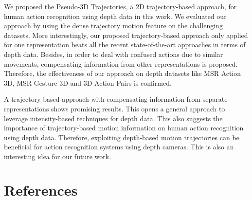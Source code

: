 \documentclass[final,3p,times,twocolumn]{elsarticle}
\begin{document}
We proposed the Pseudo-3D Trajectories, a 2D trajectory-based approach, for human action recognition using depth data in this work.
We evaluated our approach by using the dense trajectory motion feature on the challenging datasets.
More interestingly, our proposed trajectory-based approach only applied for one representation beats all the recent state-of-the-art approaches in terms of depth data.
Besides, in order to deal with confused actions due to similar movements, compensating information from other representations is proposed.
Therefore, the effectiveness of our approach on depth datasets like MSR Action 3D, MSR Gesture 3D and 3D Action Pairs is confirmed.

A trajectory-based approach with compensating information from separate representations shows promising results.
This opens a general approach to leverage intensity-based techniques for depth data.
This also suggests the importance of trajectory-based motion information on human action recognition using depth data.
Therefore, exploiting depth-based motion trajectories can be beneficial for action recognition systems using depth cameras.
This is also an interesting idea for our future work.

\section*{References}



\end{document}
